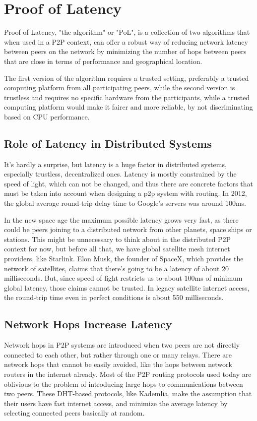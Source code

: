 \chapter{Proof of Latency}
\label{Proof of Latency}
Proof of Latency, "the algorithm" or "PoL", is a collection of two algorithms that when used in a P2P context, can offer a robust way of reducing network latency between peers on the network by minimizing the number of hops between peers that are close in terms of performance and geographical location.

The first version of the algorithm requires a trusted setting, preferably a trusted computing platform from all participating peers, while the second version is trustless and requires no specific hardware from the participants, while a trusted computing platform would make it fairer and more reliable, by not discriminating based on CPU performance.
\section{Role of Latency in Distributed Systems}
It's hardly a surprise, but latency is a huge factor in distributed systems, especially trustless, decentralized ones. Latency is mostly constrained by the speed of light, which can not be changed, and thus there are concrete factors that must be taken into account when designing a p2p system with routing. In 2012, the global average round-trip delay time to Google's servers was around 100ms.\cite{grigorik_latency_nodate}

In the new space age the maximum possible latency grows very fast, as there could be peers joining to a distributed network from other planets, space ships or stations. This might be unnecessary to think about in the distributed P2P context for now, but before all that, we have global satellite mesh internet providers, like Starlink. Elon Musk, the founder of SpaceX, which provides the network of satellites, claims that there's going to be a latency of about 20 milliseconds.\cite{tung_elon_nodate} But, since speed of light restricts us to about 100ms of minimum global latency\cite{noauthor_satellite_nodate}, those claims cannot be trusted. In legacy satellite internet access, the round-trip time even in perfect conditions is about 550 milliseconds.\cite{noauthor_satellite_nodate}

\section{Network Hops Increase Latency}
Network hops in P2P systems are introduced when two peers are not directly connected to each other, but rather through one or many relays. There are network hops that cannot be easily avoided, like the hops between network routers in the internet already. Most of the P2P routing protocols used today are oblivious to the problem of introducing large hops to communications between two peers. These DHT-based protocols, like Kademlia, make the assumption that their users have fast internet access, and minimize the average latency by selecting connected peers basically at random.


